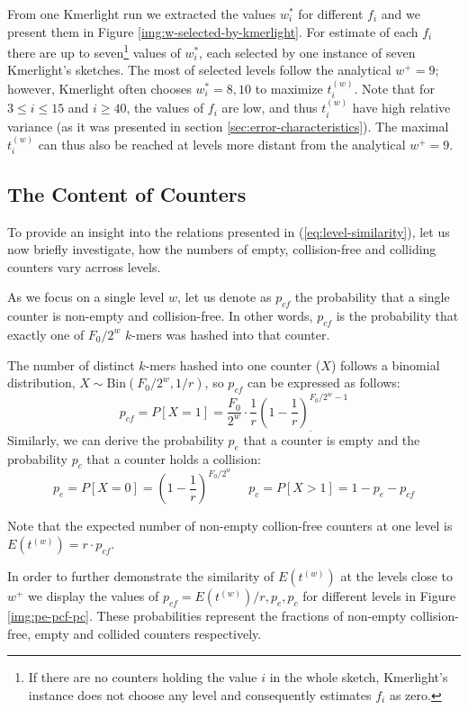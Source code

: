 From one Kmerlight run we extracted the values $w_i^*$ for different $f_i$ 
and we present them in Figure \ref{img:w-selected-by-kmerlight}.
For estimate of each $f_i$ there are up to seven\footnote{If there are no counters holding 
the value $i$ in the whole sketch,  Kmerlight's instance does not choose any level
and consequently estimates $f_i$ as zero.} values of $w_i^*$, each selected by one 
instance of seven Kmerlight's sketches. The most of selected levels follow the analytical 
$w^+ = 9$; however, Kmerlight often chooses $w_i^* = 8, 10$ to maximize $t_i^{(w)}$. 
Note that for $3\leq i \leq 15$ and $i \geq 40$, the values of $f_i$ are low, and thus 
$t_i^{(w)}$ have high relative variance (as it was presented in section
\ref{sec:error-characteristics}). The maximal $t_i^{(w)}$ can thus also be reached
at levels more distant from the analytical $w^+ = 9$.

\subsection{The Content of Counters}
To provide an insight into the relations presented in (\ref{eq:level-similarity}),
let us now briefly investigate, how the numbers of empty,
collision-free and colliding counters vary acrross levels.

As we focus on a single level $w$, let us denote as $p_{cf}$ the probability
that a single counter is non-empty and collision-free. In other words, $p_{cf}$ is the 
probability that exactly one of $F_0/2^w$ $k$-mers was hashed into that counter.

The number of distinct $k$-mers hashed into one counter ($X$)
follows a binomial distribution, $X \sim \mathrm{Bin}(F_0/2^w, 1/r)$, 
so $p_{cf}$ can be expressed as follows:
\begin{equation} \label{eq:pcf}
p_{cf} = P[X=1] = \frac{F_0}{2^w} \cdot \frac{1}{r} \left(1 - \frac{1}{r}\right)^{F_0/2^w - 1}_{.}
\end{equation}
Similarly, we can derive the probability $p_e$ that a counter is empty and the probability 
$p_c$ that a counter holds a collision:
$$p_e = P[X=0] = \left(1 - \frac{1}{r}\right)^{F_0/2^w} ~~~~~~ p_c = P[X>1] = 1 - p_e - p_{cf}$$

Note that the expected number of non-empty collion-free counters at one level is 
$E(t^{(w)}) = r \cdot p_{cf}$. 

In order to further demonstrate the similarity of $E(t^{(w)})$ at the levels close to $w^+$ we
display the values of $p_{cf} = E(t^{(w)}) / r, p_e, p_c$ for different levels in
Figure \ref{img:pe-pcf-pc}. These probabilities represent the fractions of 
non-empty collision-free, empty and collided counters respectively. 

